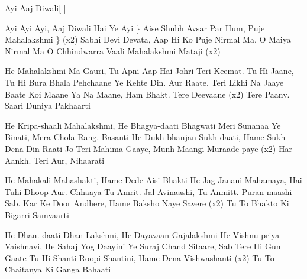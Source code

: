
\beginsong
    {Ayi Aaj Diwali}[
    ]
    
    

\chordsoff

    \beginchorus
        Ayi Ayi Ayi, Aaj Diwali Hai Ye Ayi \}
        Aise Shubh Avsar Par Hum, Puje Mahalakshmi \} (x2)
        Sabhi Devi Devata, Aap Hi Ko Puje
        Nirmal Ma, O Maiya Nirmal Ma
        O Chhindwarra Vaali Mahalakshmi Mataji (x2)
    \endchorus
        
    \beginverse
        He Mahalakshmi Ma Gauri, Tu Apni Aap Hai Johri
        Teri Keemat. Tu Hi Jaane, Tu Hi Bura Bhala Pehchaane
        Ye Kehte Din. Aur Raate, Teri Likhi Na Jaaye Baate
        Koi Maane Ya Na Maane, Ham Bhakt. Tere Deevaane (x2)
        Tere Paanv. Saari Duniya Pakhaarti
    \endverse
        
    \beginverse        
        He Kripa-shaali Mahalakshmi, He Bhagya-daati Bhagwati
        Meri Sunanaa Ye Binati, Mera Chola Rang. Basanti
        He Dukh-bhanjan Sukh-daati, Hame Sukh Dena Din Raati
        Jo Teri Mahima Gaaye, Munh Maangi Muraade paye (x2)
        Har Aankh. Teri Aur, Nihaarati
    \endverse

    \beginverse        
        He Mahakali Mahashakti, Hame Dede Aisi Bhakti
        He Jag Janani Mahamaya, Hai Tuhi Dhoop Aur. Chhaaya
        Tu Amrit. Jal Avinaashi, Tu Anmitt. Puran-maashi
        Sab. Kar Ke Door Andhere, Hame Baksho Naye Savere (x2)
        Tu To Bhakto Ki Bigarri Samvaarti
    \endverse
    
    \beginverse        
        He Dhan. daati Dhan-Lakshmi, He Dayavaan Gajalakshmi
        He Vishnu-priya Vaishnavi, He Sahaj Yog Daayini
        Ye Suraj Chand Sitaare, Sab Tere Hi Gun Gaate
        Tu Hi Shanti Roopi Shantini, Hame Dena Vishwashanti (x2)
        Tu To Chaitanya Ki Ganga Bahaati
    \endverse
   
\endsong

\newpage